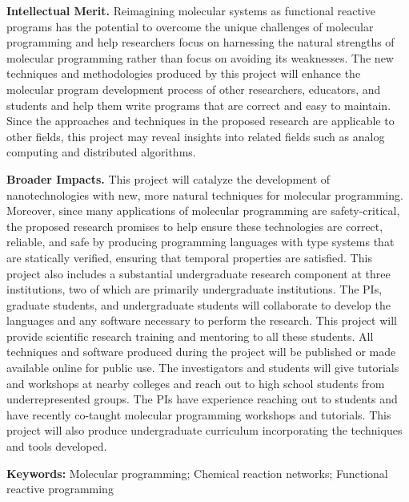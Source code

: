 \documentclass[11pt]{article}
\begin{document}
    \textbf{Intellectual Merit.}
    Reimagining molecular systems as functional reactive programs has the potential to overcome the unique challenges of molecular programming and help researchers focus on harnessing the natural strengths of molecular programming rather than focus on avoiding its weaknesses.
    The new techniques and methodologies produced by this project will enhance the molecular program development process of other researchers, educators, and students and help them write programs that are correct and easy to maintain.
    Since the approaches and techniques in the proposed research are applicable to other fields, this project may reveal insights into related fields such as analog computing and distributed algorithms.

    \textbf{Broader Impacts.}
    This project will catalyze the development of nanotechnologies with new, more natural techniques for molecular programming.
    Moreover, since many applications of molecular programming are safety-critical, the proposed research promises to help ensure these technologies are correct, reliable, and safe by producing programming languages with type systems that are statically verified, ensuring that temporal properties are satisfied.
    This project also includes a substantial undergraduate research component at three institutions, two of which are primarily undergraduate institutions.
    The PIs, graduate students, and undergraduate students will collaborate to develop the languages and any software necessary to perform the research.
    This project will provide scientific research training and mentoring to all these students.
    All techniques and software produced during the project will be published or made available online for public use.
    The investigators and students will give tutorials and workshops at nearby colleges and reach out to high school students from underrepresented groups.
    The PIs have experience reaching out to students and have recently co-taught molecular programming workshops and tutorials.
    This project will also produce undergraduate curriculum incorporating the techniques and tools developed.

    \vspace*{1ex}
    \noindent
    \textbf{Keywords:}
    Molecular programming;
    Chemical reaction networks;
    Functional reactive programming
\end{document}
